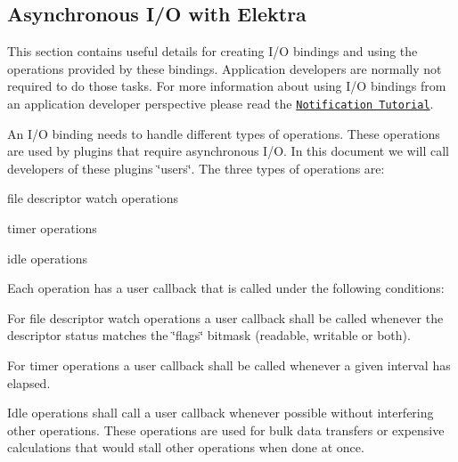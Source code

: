 \hypertarget{group__kdbio_async}{}\subsection{Asynchronous I/\+O with Elektra}\label{group__kdbio_async}
This section contains useful details for creating I/O bindings and using the operations provided by these bindings. Application developers are normally not required to do those tasks. For more information about using I/O bindings from an application developer perspective please read the \href{doc_tutorials_notifications_md.html}{\tt Notification Tutorial}.

An I/O binding needs to handle different types of operations. These operations are used by plugins that require asynchronous I/O. In this document we will call developers of these plugins \char`\"{}users\char`\"{}. The three types of operations are\+:
\begin{DoxyItemize}
\item file descriptor watch operations
\item timer operations
\item idle operations
\end{DoxyItemize}

Each operation has a user callback that is called under the following conditions\+:
\begin{DoxyItemize}
\item For file descriptor watch operations a user callback shall be called whenever the descriptor status matches the \char`\"{}flags\char`\"{} bitmask (readable, writable or both).
\item For timer operations a user callback shall be called whenever a given interval has elapsed.
\item Idle operations shall call a user callback whenever possible without interfering other operations. These operations are used for bulk data transfers or expensive calculations that would stall other operations when done at once.
\end{DoxyItemize}

